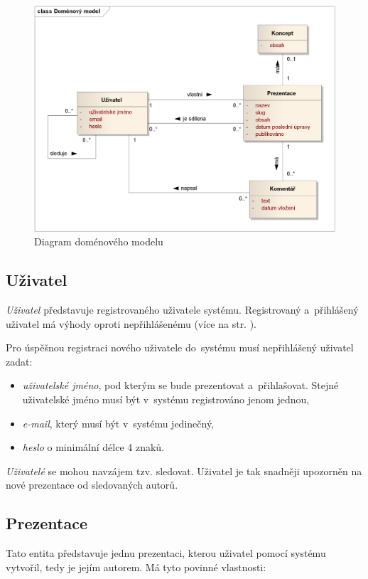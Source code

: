 \documentclass[11pt,twoside,a4paper]{book}
\begin{document}
\begin{figure}[ht]
	\begin{center}
		\includegraphics[width=14cm]{PRO-img/domain.png}
		\caption{Diagram doménového modelu}
		\label{fig:domainModel}
	\end{center}
\end{figure}

\subsection{Uživatel}
\textit{Uživatel} představuje registrovaného uživatele systému. Registrovaný a~přihlášený uživatel má výhody oproti nepřihlášenému (více na str. \pageref{chap:userstory}).

Pro úspěšnou registraci nového uživatele do~systému musí nepřihlášený uživatel zadat:

\begin{itemize}
	\item \textit{uživatelské jméno}, pod kterým se bude prezentovat a~přihlašovat. Stejné uživatelské jméno musí být v~systému registrováno jenom jednou,
	\item \textit{e-mail}, který musí být v~systému jedinečný,
	\item \textit{heslo} o minimální délce 4 znaků.
\end{itemize}

\textit{Uživatelé} se mohou navzájem tzv. sledovat. Uživatel je tak snadněji upozorněn na nové prezentace od sledovaných autorů.

\subsection{Prezentace}
Tato entita představuje jednu prezentaci, kterou uživatel pomocí systému vytvořil, tedy je jejím autorem. Má tyto povinné
vlastnosti:
\end{document}
